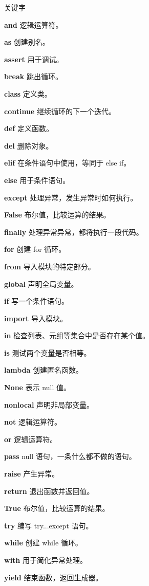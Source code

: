 \documentclass[11pt]{beamer}
\begin{document}
\begin{frame}{关键字}
	\scriptsize
	\begin{multicols}{3}
		\textbf{and}	逻辑运算符。
		
		\textbf{as}	创建别名。
		
		\textbf{assert}	用于调试。
		
	\textbf{break}	跳出循环。
		
		\textbf{class}	定义类。
		
		\textbf{continue}	继续循环的下一个迭代。
		
		\textbf{def}	定义函数。
		
		\textbf{del}	删除对象。
		
		\textbf{elif}	在条件语句中使用，等同于 else if。
		
		\textbf{else}	用于条件语句。
		
		\textbf{except}	处理异常，发生异常时如何执行。
		
		\textbf{False}	布尔值，比较运算的结果。
		
		\textbf{finally}	处理异常异常，都将执行一段代码。
		
		\textbf{for}	创建 for 循环。
		
		\textbf{from}	导入模块的特定部分。
		
		\textbf{global}	声明全局变量。
		
		\textbf{if}	写一个条件语句。
		
		\textbf{import}	导入模块。
		
		\textbf{in}	检查列表、元组等集合中是否存在某个值。
		
		\textbf{is}	测试两个变量是否相等。
		
		\textbf{lambda}	创建匿名函数。
		
		\textbf{None}	表示 null 值。
		
		\textbf{nonlocal}	声明非局部变量。
		
		\textbf{not}	逻辑运算符。
		
		\textbf{or}	逻辑运算符。
		
		\textbf{pass}	null 语句，一条什么都不做的语句。
		
		\textbf{raise}	产生异常。
		
		\textbf{return}	退出函数并返回值。
		
		\textbf{True}	布尔值，比较运算的结果。
		
		\textbf{try}	编写 try...except 语句。
		
		\textbf{while}	创建 while 循环。
		
		\textbf{with}	用于简化异常处理。
		
		\textbf{yield}	结束函数，返回生成器。
\end{multicols}
\end{frame}
\end{document}
